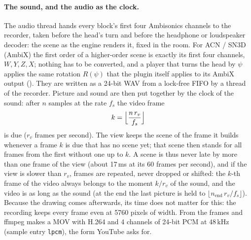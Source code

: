 \paragraph{The sound, and the audio as the clock.} The audio thread hands every block's first four Ambisonics
channels to the recorder, taken before the head's turn and before the headphone or loudspeaker decoder: the scene as
the engine renders it, fixed in the room. For ACN / SN3D (AmbiX) the first order of a higher-order scene is exactly
its first four channels, $W, Y, Z, X$; nothing has to be converted, and a player that turns the head by $\psi$
applies the same rotation $R(\psi)$ that the plugin itself applies to its AmbiX output (). They
are written as a 24-bit WAV from a lock-free FIFO by a thread of the recorder. Picture and sound are then put
together by the clock of the sound: after $n$ samples at the rate $f_s$ the video frame
\begin{equation}
  k = \Bigl\lfloor \frac{n\,r_v}{f_s} \Bigr\rfloor
\end{equation}
is due ($r_v$ frames per second). The view keeps the scene of the frame it builds whenever a frame $k$ is due that
has no scene yet; that scene then stands for all frames from the first without one up to $k$. A scene is thus never
late by more than one frame of the view (about 17\,ms at its 60 frames per second), and if the view is slower than
$r_v$, frames are repeated, never dropped or shifted: the $k$-th frame of the video always belongs to the moment
$k/r_v$ of the sound, and the video is as long as the sound (at the end the last picture is held to
$\lfloor n_{\text{end}}\,r_v/f_s\rfloor$). Because the drawing comes afterwards, its time does not matter for this:
the recording keeps every frame even at 5760 pixels of width. From the frames and  ffmpeg makes a MOV
with H.264 and 4 channels of 24-bit PCM at 48\,kHz (sample entry \texttt{lpcm}), the form YouTube asks for.

